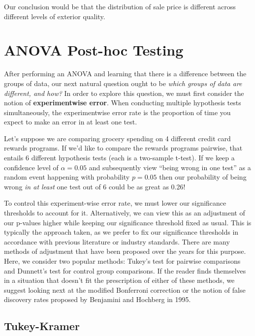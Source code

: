\documentclass[
  letterpaper,
  DIV=11,
  numbers=noendperiod]{scrreprt}
\begin{document}
Our conclusion would be that the distribution of sale price is different
across different levels of exterior quality.

\hypertarget{sec-posthoc}{%
\section{ANOVA Post-hoc Testing}\label{sec-posthoc}}

After performing an ANOVA and learning that there is a difference
between the groups of data, our next natural question ought to be
\emph{which groups of data are different, and how?} In order to explore
this question, we must first consider the notion of
\textbf{experimentwise error}. When conducting multiple hypothesis tests
simultaneously, the experimentwise error rate is the proportion of time
you expect to make an error in at least one test.

Let's suppose we are comparing grocery spending on 4 different credit
card rewards programs. If we'd like to compare the rewards programs
pairwise, that entails 6 different hypothesis tests (each is a
two-sample t-test). If we keep a confidence level of \(\alpha = 0.05\)
and subsequently view ``being wrong in one test'' as a random event
happening with probability \(p=0.05\) then our probability of being
wrong \emph{in at least} one test out of 6 could be as great as 0.26!

To control this experiment-wise error rate, we must lower our
significance thresholds to account for it. Alternatively, we can view
this as an adjustment of our p-values higher while keeping our
significance threshold fixed as usual. This is typically the approach
taken, as we prefer to fix our significance thresholds in accordance
with previous literature or industry standards. There are many methods
of adjustment that have been proposed over the years for this purpose.
Here, we consider two popular methods: Tukey's test for pairwise
comparisons and Dunnett's test for control group comparisons. If the
reader finds themselves in a situation that doesn't fit the prescription
of either of these methods, we suggest looking next at the modified
Bonferroni correction or the notion of false discovery rates proposed by
Benjamini and Hochberg in 1995.

\hypertarget{sec-tukey}{%
\subsection{Tukey-Kramer}\label{sec-tukey}}
\end{document}
